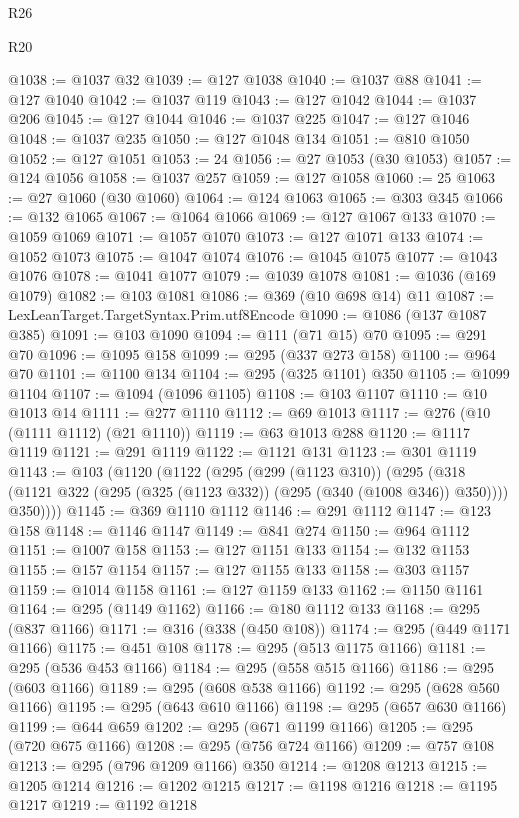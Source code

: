 \begin{lexlean}{R26}
\begin{lexlean}{R20}
\begin{coremodule}
{{{{{{{{{{{{{{{{{{{{{{{{{{{{{{{{{{{{{{{{{{{{{{{{{{{{{{{{{{{{{{{@1038 := @1037 @32
@1039 := @127 @1038
@1040 := @1037 @88
@1041 := @127 @1040
@1042 := @1037 @119
@1043 := @127 @1042
@1044 := @1037 @206
@1045 := @127 @1044
@1046 := @1037 @225
@1047 := @127 @1046
@1048 := @1037 @235
@1050 := @127 @1048 @134
@1051 := @810 @1050
@1052 := @127 @1051
@1053 := 24
@1056 := @27 @1053 (@30 @1053)
@1057 := @124 @1056
@1058 := @1037 @257
@1059 := @127 @1058
@1060 := 25
@1063 := @27 @1060 (@30 @1060)
@1064 := @124 @1063
@1065 := @303 @345
@1066 := @132 @1065
@1067 := @1064 @1066
@1069 := @127 @1067 @133
@1070 := @1059 @1069
@1071 := @1057 @1070
@1073 := @127 @1071 @133
@1074 := @1052 @1073
@1075 := @1047 @1074
@1076 := @1045 @1075
@1077 := @1043 @1076
@1078 := @1041 @1077
@1079 := @1039 @1078
@1081 := @1036 (@169 @1079)
@1082 := @103 @1081
@1086 := @369 (@10 @698 @14) @11
@1087 := LexLeanTarget.TargetSyntax.Prim.utf8Encode
@1090 := @1086 (@137 @1087 @385)
@1091 := @103 @1090
@1094 := @111 (@71 @15) @70
@1095 := @291 @70
@1096 := @1095 @158
@1099 := @295 (@337 @273 @158)
@1100 := @964 @70
@1101 := @1100 @134
@1104 := @295 (@325 @1101) @350
@1105 := @1099 @1104
@1107 := @1094 (@1096 @1105)
@1108 := @103 @1107
@1110 := @10 @1013 @14
@1111 := @277 @1110
@1112 := @69 @1013
@1117 := @276 (@10 (@1111 @1112) (@21 @1110))
@1119 := @63 @1013 @288
@1120 := @1117 @1119
@1121 := @291 @1119
@1122 := @1121 @131
@1123 := @301 @1119
@1143 := @103
    (@1120
      (@1122
        (@295
          (@299 (@1123 @310))
          (@295
            (@318 (@1121 @322 (@295 (@325 (@1123 @332)) (@295 (@340 (@1008 @346)) @350))))
            @350))))
@1145 := @369 @1110 @1112
@1146 := @291 @1112
@1147 := @123 @158
@1148 := @1146 @1147
@1149 := @841 @274
@1150 := @964 @1112
@1151 := @1007 @158
@1153 := @127 @1151 @133
@1154 := @132 @1153
@1155 := @157 @1154
@1157 := @127 @1155 @133
@1158 := @303 @1157
@1159 := @1014 @1158
@1161 := @127 @1159 @133
@1162 := @1150 @1161
@1164 := @295 (@1149 @1162)
@1166 := @180 @1112 @133
@1168 := @295 (@837 @1166)
@1171 := @316 (@338 (@450 @108))
@1174 := @295 (@449 @1171 @1166)
@1175 := @451 @108
@1178 := @295 (@513 @1175 @1166)
@1181 := @295 (@536 @453 @1166)
@1184 := @295 (@558 @515 @1166)
@1186 := @295 (@603 @1166)
@1189 := @295 (@608 @538 @1166)
@1192 := @295 (@628 @560 @1166)
@1195 := @295 (@643 @610 @1166)
@1198 := @295 (@657 @630 @1166)
@1199 := @644 @659
@1202 := @295 (@671 @1199 @1166)
@1205 := @295 (@720 @675 @1166)
@1208 := @295 (@756 @724 @1166)
@1209 := @757 @108
@1213 := @295 (@796 @1209 @1166) @350
@1214 := @1208 @1213
@1215 := @1205 @1214
@1216 := @1202 @1215
@1217 := @1198 @1216
@1218 := @1195 @1217
@1219 := @1192 @1218
}}}}}}}}}}}}}}}}}}}}}}}}}}}}}}}}}}}}}}}}}}}}}}}}}}}}}}}}}}}}}}}
\end{coremodule}
\end{lexlean}
\end{lexlean}
